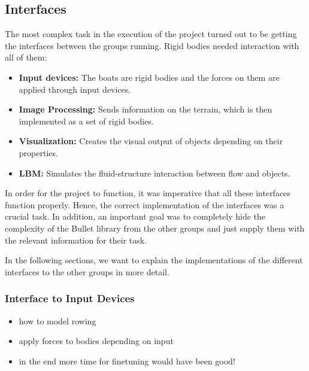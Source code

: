 \subsection{Interfaces}
The most complex task in the execution of the project turned out to be getting the interfaces between the groups running. Rigid bodies needed interaction with all of them:
\begin{itemize}
\item \textbf{Input devices:} The boats are rigid bodies and the forces on them are applied through input devices.
\item \textbf{Image Processing:} Sends information on the terrain, which is then implemented as a set of rigid bodies.
\item \textbf{Visualization:} Creates the visual output of objects depending on their properties.
\item \textbf{LBM:} Simulates the fluid-structure interaction between flow and objects.
\end{itemize}
In order for the project to function, it was imperative that all these interfaces function properly. Hence, the correct implementation of the interfaces was a crucial task.
In addition, an important goal was to completely hide the complexity of the Bullet library from the other groups and just supply them with the relevant information for their task.

In the following sections, we want to explain the implementations of the different interfaces to the other groups in more detail.
\subsubsection{Interface to Input Devices}
\begin{itemize}
\item how to model rowing
\item apply forces to bodies depending on input
\item in the end more time for finetuning would have been good!
\end{itemize}

